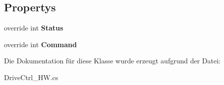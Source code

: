 \subsection*{Propertys}
\begin{DoxyCompactItemize}
\item 
\hypertarget{class_robot_ctrl_1_1_drive_ctrl___h_w_ab77cfbe90640881ca1e051fab36f02ac}{
override int {\bfseries Status}}
\label{class_robot_ctrl_1_1_drive_ctrl___h_w_ab77cfbe90640881ca1e051fab36f02ac}

\item 
\hypertarget{class_robot_ctrl_1_1_drive_ctrl___h_w_acc8cbfa5af4849ee85babc540ad63ada}{
override int {\bfseries Command}}
\label{class_robot_ctrl_1_1_drive_ctrl___h_w_acc8cbfa5af4849ee85babc540ad63ada}

\end{DoxyCompactItemize}


Die Dokumentation für diese Klasse wurde erzeugt aufgrund der Datei:\begin{DoxyCompactItemize}
\item 
DriveCtrl\_\-HW.cs\end{DoxyCompactItemize}
